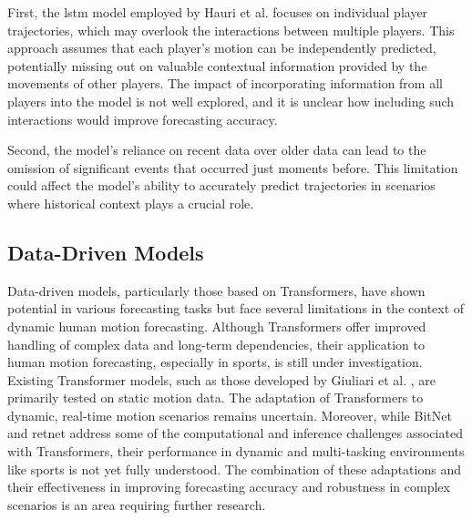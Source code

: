 First, the \gls{lstm} model employed by Hauri et al. focuses on individual player trajectories, which may overlook the interactions between multiple players. This approach assumes that each player's motion can be independently predicted, potentially missing out on valuable contextual information provided by the movements of other players. The impact of incorporating information from all players into the model is not well explored, and it is unclear how including such interactions would improve forecasting accuracy.

Second, the model's reliance on recent data over older data can lead to the omission of significant events that occurred just moments before. This limitation could affect the model's ability to accurately predict trajectories in scenarios where historical context plays a crucial role.

\subsection{Data-Driven Models}
\label{sec:related_models}
Data-driven models, particularly those based on Transformers, have shown potential in various forecasting tasks but face several limitations in the context of dynamic human motion forecasting. Although Transformers offer improved handling of complex data and long-term dependencies, their application to human motion forecasting, especially in sports, is still under investigation. Existing Transformer models, such as those developed by Giuliari et al. \cite{giuliari2020transformer}, are primarily tested on static motion data. The adaptation of Transformers to dynamic, real-time motion scenarios remains uncertain.
Moreover, while BitNet \cite{BitNet2023} and \gls{retnet} \cite{RetNet} address some of the computational and inference challenges associated with Transformers, their performance in dynamic and multi-tasking environments like sports is not yet fully understood. The combination of these adaptations and their effectiveness in improving forecasting accuracy and robustness in complex scenarios is an area requiring further research.

